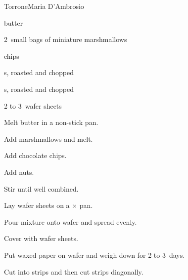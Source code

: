 \begin{recipe}{Torrone}{Maria D'Ambrosio}{}

\begin{ingredients}
\item \C{\threequarter} butter
\item 2~small bags of miniature marshmallows
\item \C{2\half}  chips
\item {} s, roasted and chopped
\item {} s, roasted and chopped
\item 2 to 3~wafer sheets
\end{ingredients}

\begin{directions}
\item Melt butter in a non-stick pan.
\item Add marshmallows and melt.
\item Add chocolate chips.
\item Add nuts.
\item Stir until well combined.
\item Lay wafer sheets on a $\times$ pan.
\item Pour mixture onto wafer and spread evenly.
\item Cover with wafer sheets.
\item Put waxed paper on wafer and weigh down for 2 to 3~days.
\item Cut into strips and then cut strips diagonally.
\end{directions}

\end{recipe}
